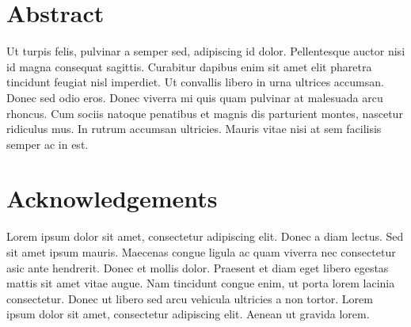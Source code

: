\documentclass[12pt]{report}
\begin{document}
\blankpage	%

\chapter*{Abstract}
Ut turpis felis, pulvinar a semper sed, adipiscing id dolor. Pellentesque auctor nisi id magna consequat sagittis. Curabitur dapibus enim sit amet elit pharetra tincidunt feugiat nisl imperdiet. Ut convallis libero in urna ultrices accumsan. Donec sed odio eros. Donec viverra mi quis quam pulvinar at malesuada arcu rhoncus. Cum sociis natoque penatibus et magnis dis parturient montes, nascetur ridiculus mus. In rutrum accumsan ultricies. Mauris vitae nisi at sem facilisis semper ac in est.

\blankpage

\chapter*{Acknowledgements}
Lorem ipsum dolor sit amet, consectetur adipiscing elit. Donec a diam lectus. Sed sit amet ipsum mauris. Maecenas congue ligula ac quam viverra nec consectetur \gls{asic} ante hendrerit. Donec et mollis dolor. Praesent et diam eget libero egestas \cite{obt} mattis sit amet vitae augue. Nam tincidunt congue enim, ut porta lorem lacinia consectetur. Donec ut libero sed arcu vehicula ultricies a non tortor. Lorem ipsum dolor sit amet, consectetur adipiscing elit. Aenean ut gravida lorem.

\blankpage

\setcounter{tocdepth}{3}
\tableofcontents

\blankpage

\setlength{\parskip}{0.2in}





%


\newpage

\clearpage



\newpage

\printglossaries

%
%
%
%
%
\end{document}
